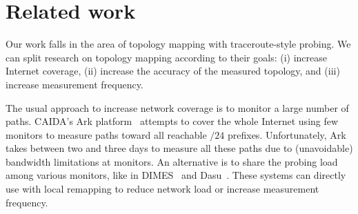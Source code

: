 \section{Related work}
\label{sec:related}


%

Our work falls in the area of topology mapping with traceroute-style
probing. We can split research on topology mapping according to their
goals: (i) increase Internet coverage, (ii) increase the accuracy of the
measured topology, and (iii) increase measurement frequency.

The usual approach to increase network coverage is to monitor a large
number of paths.  CAIDA's Ark platform~\cite{skitter} attempts to cover
the whole Internet using few monitors to measure paths toward all
reachable $/24$ prefixes.  Unfortunately, Ark takes between two and
three days to measure all these paths due to (unavoidable) bandwidth
limitations at monitors.  An alternative is to share the probing load
among various monitors, like in DIMES~\cite{shavitt09dimes} and
Dasu~\cite{sanchez13dasu}.  These systems can directly use \dtrack{}
with local remapping to reduce network load or increase measurement
frequency.


